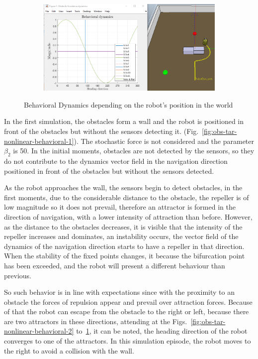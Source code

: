 \begin{figure}[htb!]
\begin{subfigure}{.45\textwidth}
  \caption{}%
  \label{fig:obs-tar-nonlinear-behavioral-5}
  \end{subfigure}
  \begin{subfigure}{.45\textwidth}
    \includegraphics[width=\textwidth]{img/3-2-6.PNG}%
  \caption{}%
  \label{fig:obs-tar-nonlinear-behavioral-6}
  \end{subfigure}
  \caption{Behavioral Dynamics depending on the robot's position in the world}%
  \label{fig:obs-tar-nonlinear-behavioral}
\end{figure}

In the first simulation, the obstacles form a wall and the robot is
positioned in front of the obstacles but without the sensors detecting it. (Fig.~\ref{fig:obs-tar-nonlinear-behavioral-1}). 
The stochastic force is not considered and the parameter $\beta _{2}$ is 50.
In the initial moments, obstacles are not detected by the sensors, so they do
not contribute to the dynamics vector field in the navigation direction 
positioned in front of the obstacles but without the sensors detected.

As the robot approaches the wall, the sensors begin to detect obstacles, in the
first moments, due to the considerable distance to the obstacle, the repeller is
of low magnitude so it does not prevail, therefore an attractor is formed in the
direction of navigation, with a lower intensity of attraction than
before. However, as the distance to the obstacles decreases, it is visible that
the intensity of the repeller increases and dominates, an instability occurs,
the vector field of the dynamics of the navigation direction starts to have a
repeller in that direction. When the stability of the fixed points changes, it
because the bifurcation point has been exceeded, and the robot will present a
different behaviour than previous.

So such behavior is in line with expectations since with the proximity to an
obstacle the forces of repulsion
appear and prevail over attraction forces. Because of that the robot can escape from the obstacle to the right or
left, because there are two attractors in these directions, attending at the
Figs.~\ref{fig:obs-tar-nonlinear-behavioral-2} to~\ref{fig:obs-tar-nonlinear-behavioral-5}, it can be noted, the heading direction of the robot
converges to one of the attractors. In this simulation episode, the robot moves
to the right to avoid a collision with the wall. 

